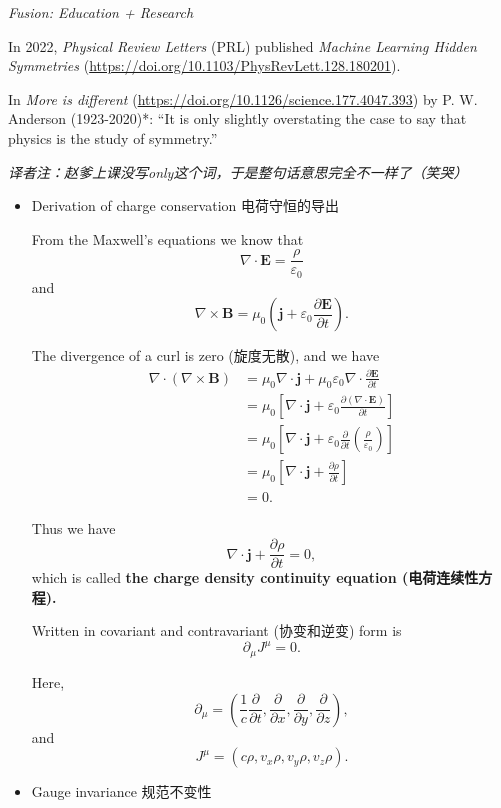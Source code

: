 \emph{Fusion: Education + Research}

In 2022, \emph{Physical Review Letters} (PRL) published \emph{Machine Learning Hidden Symmetries} (\url{https://doi.org/10.1103/PhysRevLett.128.180201}).

In \emph{More is different} (\url{https://doi.org/10.1126/science.177.4047.393}) by P. W. Anderson (1923-2020)*: ``It is only slightly overstating the case to say that physics is the study of symmetry.''

\emph{译者注：赵爹上课没写only这个词，于是整句话意思完全不一样了（笑哭）}

\begin{itemize}
\tightlist{}
\item
  Derivation of charge conservation 电荷守恒的导出

  From the Maxwell's equations we know that
  \[\nabla \cdot \boldsymbol E = \dfrac{\rho}{\varepsilon_0}\] and
  \[\nabla \times \boldsymbol{B} = \mu_0 \left( \boldsymbol{j} + \varepsilon_0 \frac{\partial \boldsymbol{E}}{\partial t} \right).\]

  The divergence of a curl is zero (旋度无散), and we have
  \begin{align*}
        \nabla \cdot \left( \nabla \times \boldsymbol{B} \right) & = \mu_0 \nabla \cdot \boldsymbol{j} + \mu_0 \varepsilon_0 \nabla \cdot \frac{\partial \boldsymbol{E}}{\partial t} \\
        & = \mu_0 \left[ \nabla \cdot \boldsymbol{j} + \varepsilon_0 \frac{\partial \left( \nabla \cdot \boldsymbol{E} \right)}{\partial t} \right] \\
        & = \mu_0 \left[ \nabla \cdot \boldsymbol{j} + \varepsilon_0 \frac{\partial}{\partial t} \left( \frac{\rho}{\varepsilon_0} \right) \right] \\
        & = \mu_0 \left[ \nabla \cdot \boldsymbol{j} + \frac{\partial \rho}{\partial t} \right] \\
        & = 0.
    \end{align*}

  Thus we have
  \[\nabla \cdot \boldsymbol{j} + \frac{\partial \rho}{\partial t} = 0,\]
  which is called \textbf{the charge density continuity equation
  (电荷连续性方程).}

  Written in covariant and contravariant (协变和逆变) form is
  \[\partial_{\mu} J^{\mu} = 0.\]

  Here,
  \[\partial_{\mu} = \left( \frac{1}{c} \frac{\partial}{\partial t}, \frac{\partial}{\partial x}, \frac{\partial}{\partial y}, \frac{\partial}{\partial z} \right),\]
  and \[J^{\mu} = \left( c \rho, v_x \rho, v_y \rho, v_z \rho \right).\]
\item
  Gauge invariance 规范不变性


\end{itemize}
